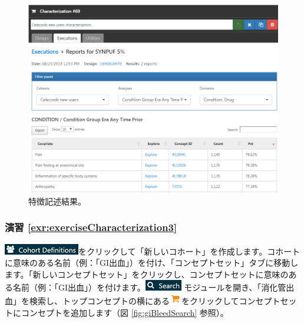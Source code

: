 \documentclass[
  11pt]{book}
\theoremstyle{definition}
\theoremstyle{definition}
\theoremstyle{definition}
\theoremstyle{definition}
\theoremstyle{remark}
\begin{document}
\begin{figure}

{\centering \includegraphics[width=1\linewidth]{images/SuggestedAnswers/celecoxibCharacterizationResults} 

}

\caption{特徴記述結果。}\label{fig:celecoxibCharacterizationResults}
\end{figure}

\subsubsection*{演習 \ref{exr:exerciseCharacterization3}}\label{ux6f14ux7fd2-refexrexercisecharacterization3}

\includegraphics{images/Cohorts/cohortdefinition.png}をクリックして「新しいコホート」を作成します。コホートに意味のある名前（例：「GI出血」）を付け、「コンセプトセット」タブに移動します。「新しいコンセプトセット」をクリックし、コンセプトセットに意味のある名前（例：「GI出血」）を付けます。\includegraphics{images/Cohorts/search-2.png} モジュールを開き、「消化管出血」を検索し、トップコンセプトの横にある\includegraphics{images/Cohorts/shoppingcart.png}をクリックしてコンセプトセットにコンセプトを追加します（図 \ref{fig:giBleedSearch} 参照）。
\end{document}
